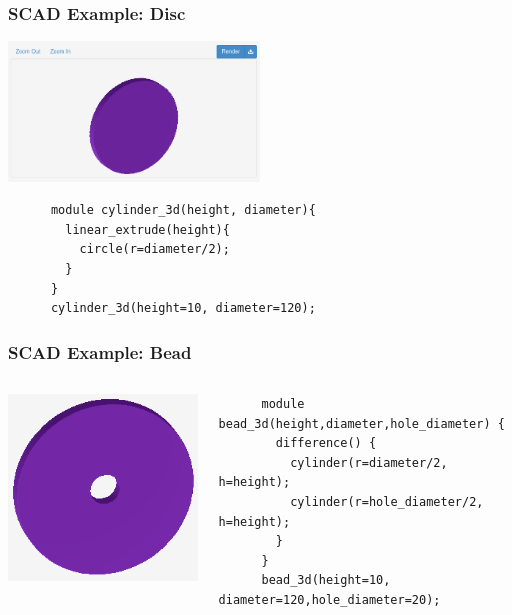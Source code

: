 \documentclass{beamer}
\begin{document}
\begin{frame}[fragile]
\frametitle{SCAD Example: Disc}
\includegraphics[width=0.5\textwidth, center]{disc_example.png}
  \lstset{basicstyle=\ttfamily\scriptsize}
    \begin{lstlisting}
      module cylinder_3d(height, diameter){
        linear_extrude(height){
          circle(r=diameter/2);
        }
      }
      cylinder_3d(height=10, diameter=120);
    \end{lstlisting}
\end{frame}

\begin{frame}[fragile]
\frametitle{SCAD Example: Bead}
\lstset{basicstyle=\ttfamily\scriptsize}
\begin{columns}
  \begin{column}{0.2\textwidth}
    \includegraphics[width=1.0\textwidth, center]{bead_example.png}
  \end{column}
  \begin{column}{0.8\textwidth}
    \begin{lstlisting}
      module bead_3d(height,diameter,hole_diameter) {
        difference() {
          cylinder(r=diameter/2, h=height);
          cylinder(r=hole_diameter/2, h=height);
        }
      }
      bead_3d(height=10, diameter=120,hole_diameter=20);
    \end{lstlisting}
  \end{column}
\end{columns}
\end{frame}
\end{document}
